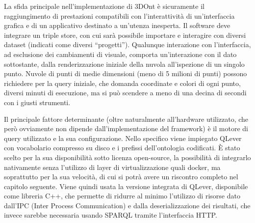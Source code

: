 La sfida principale nell'implementazione di 3DOnt è sicuramente il raggiungimento di prestazioni compatibili con l'interattività
di un'interfaccia grafica e di un applicativo destinato a un'utenza inesperta. 
Il software deve integrare un triple store, con cui sarà possibile importare e interagire con diversi dataset (indicati come 
diversi ``progetti''). Qualunque interazione con l'interfaccia, ad esclusione dei cambiamenti di visuale, comporta un'interazione
con il dato sottostante, dalla renderizzazione iniziale della nuvola all'ispezione di un singolo punto.
Nuvole di punti di medie dimensioni (meno di 5 milioni di punti) possono richiedere per la query iniziale, che domanda coordinate e 
colori di ogni punto, diversi minuti di esecuzione, ma si può scendere a meno di una decina di secondi con i giusti strumenti.
\par Il principale fattore determinante (oltre naturalmente all'hardware utilizzato, che però ovviamente non dipende dall'implementazione
del framework) è il motore di query utilizzato e la sua configurazione. Nello specifico viene impiegato QLever~\cite{bast2017qlever,bast2022qlever} 
con vocabolario compresso su disco e i prefissi dell'ontologia codificati. È stato scelto per la sua disponibilità sotto licenza
open-source, la possibilità di integrarlo nativamente senza l'utilizzo di layer di virtualizzazione quali docker, ma soprattutto
per la sua velocità, di cui si potrà avere un riscontro completo nel capitolo seguente.
 Viene quindi usata la versione integrata di QLever, disponibile come libreria C++, che permette di ridurre al minimo l'utilizzo di 
risorse dato dall'IPC (Inter Process Communication) e dalla deserializzazione dei risultati, 
che invece sarebbe necessaria usando SPARQL tramite l'interfaccia HTTP.
